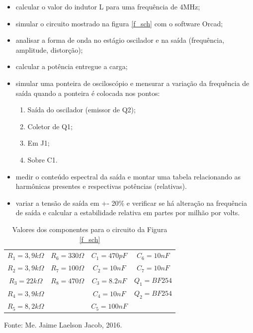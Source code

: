 \begin{itemize}
\item calcular o valor do indutor L para uma frequência de 4MHz;
\item simular o circuito mostrado na figura \ref{f_sch} com o software Orcad;
\item analisar a forma de onda no estágio oscilador e na saída (frequência, amplitude, distorção);
\item calcular a potência entregue a carga;
\item simular uma ponteira de osciloscópio e mensurar a variação da frequência de saída quando a ponteira é colocada nos pontos:
    \begin{enumerate}[label=\roman{*}]
        \item Saída do oscilador (emissor de Q2);
        \item Coletor de Q1;
        \item Em J1;
        \item Sobre C1.
    \end{enumerate}
\item medir o conteúdo espectral da saída e montar uma tabela relacionando as harmônicas presentes e respectivas potências (relativas).
\item variar a tensão de saída em +- 20\% e verificar se há alteração na frequência de saída e calcular a estabilidade relativa em partes por milhão por volts.
\end{itemize}


\begin{table}[H]
    \begin{center}
        \caption{Valores dos componentes para o circuito da Figura \ref{f_sch}}        \label{tab:componentes}
        \begin{tabular}{c|c|c|c}
            \hline
            $R_1 = 3,9k\Omega$ & $R_6 = 330\Omega$ & $C_1 = 470pF$ & $C_6 = 10nF$ \\
            $R_2 = 3,9k\Omega$ & $R_7 = 100\Omega$ & $C_2 = 10nF$ & $C_7 = 10nF$ \\
            $R_3 = 22k\Omega$ & $R_8 = 470\Omega$ & $C_3 = 8.2nF$ & $Q_1 = BF254$ \\
            $R_4 = 3,9k\Omega$ & & $C_4 = 10nF$ & $Q_2 = BF254$ \\
            $R_5 = 8,2k\Omega$ & & $C_5 = 100nF$ & \\
            \hline
        \end{tabular}
        
        \small Fonte: Me. Jaime Laelson Jacob, 2016.
    \end{center}
\end{table}
